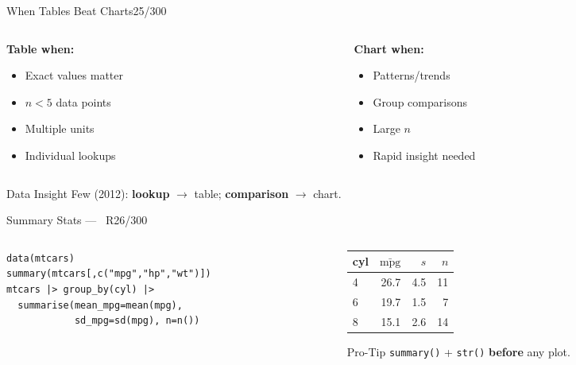 \documentclass[10pt]{beamer}
\newcommand{\Rlang}{\textcolor{RAccent}{\faRProject~R}}
\newcommand{\smark}[1]{\hfill{\scriptsize\color{codegray}#1}}
\begin{document}
\begin{frame}{When Tables Beat Charts}\smark{25/300}
\begin{columns}[T]
\begin{column}{0.48\textwidth}
\textbf{Table when:}
\begin{itemize}
    \item Exact values matter
    \item $n < 5$ data points
    \item Multiple units
    \item Individual lookups
\end{itemize}
\end{column}
\begin{column}{0.48\textwidth}
\textbf{Chart when:}
\begin{itemize}
    \item Patterns/trends
    \item Group comparisons
    \item Large $n$
    \item Rapid insight needed
\end{itemize}
\end{column}
\end{columns}
\vspace{0.2cm}
\begin{exampleblock}{Data Insight}
    \scriptsize Few (2012): \textbf{lookup} $\to$ table; \textbf{comparison} $\to$ chart.
\end{exampleblock}
\end{frame}

\begin{frame}[fragile]{Summary Stats --- \Rlang}\smark{26/300}
\begin{columns}[T]
\begin{column}{0.52\textwidth}
\begin{lstlisting}[style=Rstyle]
data(mtcars)
summary(mtcars[,c("mpg","hp","wt")])
mtcars |> group_by(cyl) |>
  summarise(mean_mpg=mean(mpg),
            sd_mpg=sd(mpg), n=n())
\end{lstlisting}
\end{column}
\begin{column}{0.45\textwidth}\scriptsize
\begin{tabular}{@{}lrrr@{}}
    \toprule
    cyl & $\bar{\text{mpg}}$ & $s$ & $n$ \\
    \midrule
    4 & 26.7 & 4.5 & 11 \\
    6 & 19.7 & 1.5 &  7 \\
    8 & 15.1 & 2.6 & 14 \\
    \bottomrule
\end{tabular}
\begin{alertblock}{Pro-Tip}
    \scriptsize \texttt{summary()} + \texttt{str()} \textbf{before} any plot.
\end{alertblock}
\end{column}
\end{columns}
\end{frame}
\end{document}
